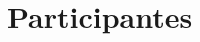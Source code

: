 \section{Participantes}
	\begin{enumerate}[label=\alph*.]
	   	\printParticipantsList{}
	\end{enumerate}